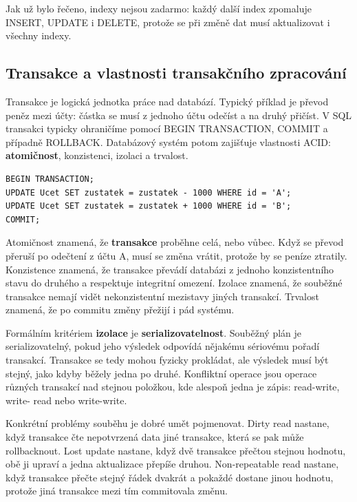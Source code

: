Jak už bylo řečeno, indexy nejsou zadarmo: každý další index zpomaluje INSERT, UPDATE i DELETE, protože se při změně dat musí aktualizovat i všechny indexy.

\subsection*{Transakce a vlastnosti transakčního zpracování}

Transakce je logická jednotka práce nad databází. Typický příklad je převod peněz mezi účty: částka se musí z jednoho účtu odečíst a na druhý přičíst. V SQL transakci typicky ohraničíme pomocí BEGIN TRANSACTION, COMMIT a případně ROLLBACK. Databázový systém potom zajišťuje vlastnosti ACID: \textbf{atomičnost}, konzistenci, izolaci a trvalost.

\begin{codebox}
\small
\begin{verbatim}
BEGIN TRANSACTION;
UPDATE Ucet SET zustatek = zustatek - 1000 WHERE id = 'A';
UPDATE Ucet SET zustatek = zustatek + 1000 WHERE id = 'B';
COMMIT;
\end{verbatim}
\end{codebox}

Atomičnost znamená, že \textbf{transakce} proběhne celá, nebo vůbec. Když se převod přeruší po odečtení z účtu A, musí se změna vrátit, protože by se peníze ztratily. Konzistence znamená, že transakce převádí databázi z jednoho konzistentního stavu do druhého a respektuje integritní omezení. Izolace znamená, že souběžné transakce nemají vidět nekonzistentní mezistavy jiných transakcí. Trvalost znamená, že po commitu změny přežijí i pád systému.

Formálním kritériem \textbf{izolace} je \textbf{serializovatelnost}. Souběžný plán je serializovatelný, pokud jeho výsledek odpovídá nějakému sériovému pořadí transakcí. Transakce se tedy mohou fyzicky prokládat, ale výsledek musí být stejný, jako kdyby běžely jedna po druhé. Konfliktní operace jsou operace různých transakcí nad stejnou položkou, kde alespoň jedna je zápis: read-write, write- read nebo write-write.

Konkrétní problémy souběhu je dobré umět pojmenovat. Dirty read nastane, když transakce čte nepotvrzená data jiné transakce, která se pak může rollbacknout. Lost update nastane, když dvě transakce přečtou stejnou hodnotu, obě ji upraví a jedna aktualizace přepíše druhou. Non-repeatable read nastane, když transakce přečte stejný řádek dvakrát a pokaždé dostane jinou hodnotu, protože jiná transakce mezi tím commitovala změnu.

